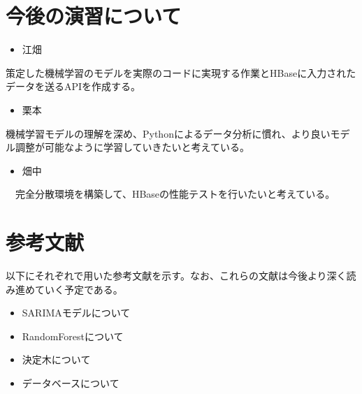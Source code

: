 \documentclass{scrartcl}
\begin{document}
\section{今後の演習について}
\label{sec:orgf289936}
\begin{itemize}
\item 江畑\\
\end{itemize}
策定した機械学習のモデルを実際のコードに実現する作業とHBaseに入力されたデータを送るAPIを作成する。\\
\begin{itemize}
\item 栗本\\
\end{itemize}
機械学習モデルの理解を深め、Pythonによるデータ分析に慣れ、より良いモデル調整が可能なように学習していきたいと考えている。\\
\begin{itemize}
\item 畑中\\
\end{itemize}
　完全分散環境を構築して、HBaseの性能テストを行いたいと考えている。\\



\section{参考文献}
\label{sec:org413c898}
以下にそれぞれで用いた参考文献を示す。なお、これらの文献は今後より深く読み進めていく予定である。\\
\begin{itemize}
\item SARIMAモデルについて \cite{sarima01} \cite{sarima02} \cite{sarima03} \cite{sarima04} \cite{sarima05}\\
\item RandomForestについて \cite{rf01} \cite{rf02} \cite{rf03} \cite{rf04} \cite{rf05} \cite{rf06} \cite{rf07} \cite{Breiman:2001:RF:570181.570182} \cite{rf08} \cite{rf09}\\
\item 決定木について \cite{tree01}\\
\item データベースについて \cite{hbase01} \cite{hbase02} \cite{hbase03}\\
\end{itemize}

\printbibliography\\
\end{document}
